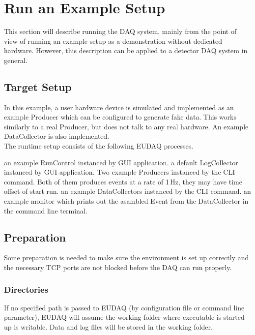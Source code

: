 \section{Run an Example Setup}
This section will describe running the DAQ system, mainly from the point of view of running an example setup as a demonstration without dedicated hardware.
However, this description can be applied to a detector DAQ system in general.

\subsection{Target Setup}
In this example, a user hardware device is simulated and implemented as an example Producer which can be configured to generate fake data. This works similarly to a real Producer, but does not talk to any real hardware. An example DataCollector is also implemented. \\
The runtime setup consists of the following EUDAQ processes.
\begin{description}
an example RunControl instanced by GUI application.
a default LogCollector instanced by GUI application.
Two example Producers instanced by the CLI command. Both of them produces events at a rate of 1\,Hz, they may have time offset of start run.
an example DataCollectors instanced by the CLI command.
an example monitor which prints out the asambled Event from the DataCollector in the command line terminal.
\end{description}

\subsection{Preparation}
Some preparation is needed to make sure the environment is set up correctly and
the necessary TCP ports are not blocked before the DAQ can run properly.

\subsubsection{Directories}
If no specified path is passed to EUDAQ (by configuration file or command line parameter), EUDAQ will assume the working folder where executable is started up is writable. Data and log files will be stored in the working folder.

